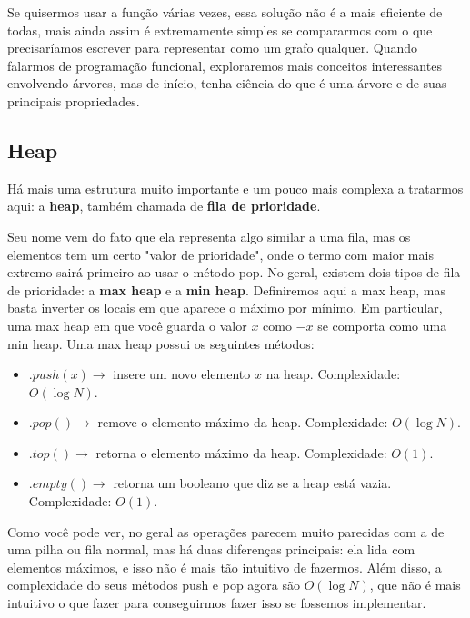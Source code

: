 \documentclass[11pt, a4paper]{article}
\begin{document}
Se quisermos usar a função várias vezes, essa solução não é a mais eficiente de todas, mais ainda assim é extremamente simples se compararmos com o que precisaríamos escrever para representar como um grafo qualquer. Quando falarmos de programação funcional, exploraremos mais conceitos interessantes envolvendo árvores, mas de início, tenha ciência do que é uma árvore e de suas principais propriedades.

\subsection{Heap}

Há mais uma estrutura muito importante e um pouco mais complexa a tratarmos aqui: a \textbf{heap}, também chamada de \textbf{fila de prioridade}.

Seu nome vem do fato que ela representa algo similar a uma fila, mas os elementos tem um certo "valor de prioridade", onde o termo com maior mais extremo sairá primeiro ao usar o método pop. No geral, existem dois tipos de fila de prioridade: a \textbf{max heap} e a \textbf{min heap}. Definiremos aqui a max heap, mas basta inverter os locais em que aparece o máximo por mínimo. Em particular, uma max heap em que você guarda o valor \(x\) como \(-x\) se comporta como uma min heap. Uma max heap possui os seguintes métodos:

\begin{itemize}
    \item \(.push(x) \rightarrow\) insere um novo elemento \(x\) na heap. Complexidade: \(O(\log N)\).

    \item \(.pop() \rightarrow\) remove o elemento máximo da heap. Complexidade: \(O(\log N)\).

    \item \(.top() \rightarrow\) retorna o elemento máximo da heap. Complexidade: \(O(1)\).

    \item \(.empty() \rightarrow\) retorna um booleano que diz se a heap está vazia. Complexidade: \(O(1)\).
    
\end{itemize}

Como você pode ver, no geral as operações parecem muito parecidas com a de uma pilha ou fila normal, mas há duas diferenças principais: ela lida com elementos máximos, e isso não é mais tão intuitivo de fazermos. Além disso, a complexidade do seus métodos push e pop agora são \(O(\log N)\), que não é mais intuitivo o que fazer para conseguirmos fazer isso se fossemos implementar.
\end{document}
